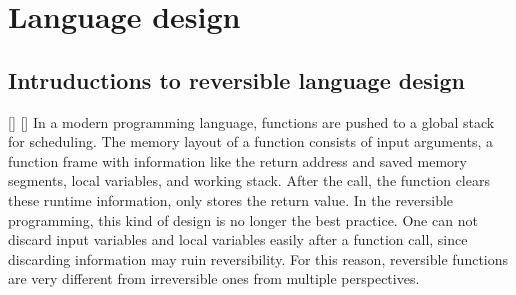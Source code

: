 \documentclass[aps,twocolumn,longbibliography,english,superscriptaddress]{revtex4-1}
\newcommand{\<}{\langle}
\renewcommand{\>}{\rangle}
\newcommand{\blue}[1]{[{\bf  \color{blue}{JG: #1}}]}
\newcommand{\violet}[1]{[{\bf  \color{violet}{MLS: #1}}]}
\theoremstyle{definition}\newtheorem{definition}{\textit{Definition}}
\begin{document}
\section{Language design}\label{sec:lang}

    \subsection{Intruductions to reversible language design}\blue{how about now? feel free to comment more}
    \violet{Add more introduction to reversible programming}
    In a modern programming language, functions are pushed to a global stack for scheduling. The memory layout of a function consists of input arguments, a function frame with information like the return address and saved memory segments, local variables, and working stack. After the call, the function clears these runtime information, only stores the return value. In the reversible programming, this kind of design is no longer the best practice. One can not discard input variables and local variables easily after a function call, since discarding information may ruin reversibility. For this reason, reversible functions are very different from irreversible ones from multiple perspectives.
\end{document}
